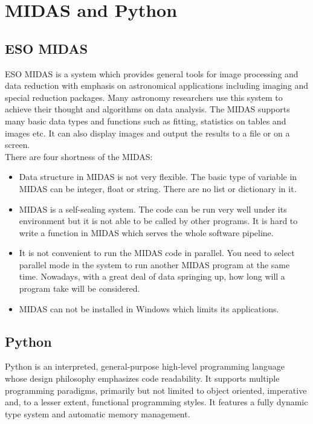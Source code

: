 \documentclass[11pt,twoside]{article}
\begin{document}
          \section{MIDAS and Python}
\subsection{ESO MIDAS}

ESO MIDAS is a system which provides general tools for image processing 
and data reduction with emphasis on astronomical applications including 
imaging and special reduction packages. Many astronomy researchers use 
this system to achieve their thought and algorithms on data analysis. 
The MIDAS supports many basic data types and functions such as fitting, 
statistics on tables and images etc. It can also display images 
and output the results to a file or on a screen. \\

There are four shortness of the MIDAS:
\begin{itemize}
  \item  Data structure 
in MIDAS is not very flexible. The basic type of variable in MIDAS can be 
integer, float or string. There are no list or dictionary in it. 
   \item  
MIDAS is a self-sealing system. The code can be run very well under 
its environment but it is not able to be called by other programs. It 
is hard to write a function in MIDAS which serves the whole software 
pipeline. 
   \item  It is not convenient to run the MIDAS code
 in parallel.    You need to select parallel mode in the system to run 
another MIDAS program at the same time. Nowadays, with a great deal of data
 springing up, how long will a program take will be considered.  
    \item MIDAS can not be installed in Windows which limits its
applications. 
\end{itemize}

          \subsection{Python}
Python is an interpreted, general-purpose high-level programming language 
whose design philosophy emphasizes code readability. It supports multiple 
programming paradigms, primarily but not limited to object oriented, 
imperative and, to a lesser extent, functional programming styles. It 
features a fully dynamic type system and automatic memory management. 
\end{document}
